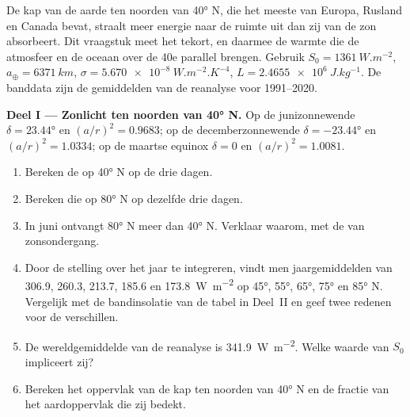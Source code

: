 \begin{problem}
\label{pb:b1:radiation-heat-transport:1}
De kap van de aarde ten noorden van \ang{40} N, die het meeste van Europa, Rusland en Canada bevat, straalt meer energie naar de ruimte uit dan zij van de zon absorbeert. Dit vraagstuk meet het tekort, en daarmee de warmte die de atmosfeer en de oceaan over de 40e parallel brengen. Gebruik $S_0 = \qty{1361}{W.m^{-2}}$,
$a_\oplus = \qty{6371}{km}$, $\sigma = \qty{5.670e-8}{W.m^{-2}.K^{-4}}$, $L =
\qty{2.4655e6}{J.kg^{-1}}$. De banddata zijn de gemiddelden van de reanalyse voor 1991--2020.

\medskip
\noindent\textbf{Deel I --- Zonlicht ten noorden van \ang{40} N.} Op de junizonnewende
$\delta = \ang{23.44}$ en $(a/r)^2 = 0.9683$; op de decemberzonnewende $\delta =
\ang{-23.44}$ en $(a/r)^2 = 1.0334$; op de maartse equinox $\delta = 0$ en
$(a/r)^2 = 1.0081$.
\begin{enumerate}
  \item Bereken de  op \ang{40} N op de drie dagen.
  \item Bereken die op \ang{80} N op dezelfde drie dagen.
  \item In juni ontvangt \ang{80} N meer dan \ang{40} N. Verklaar waarom, met de  van zonsondergang.
  \item Door de stelling over het jaar te integreren, vindt men jaargemiddelden van \qty{306.9}{}, \qty{260.3}{}, \qty{213.7}{}, \qty{185.6}{} en
        \qty{173.8}{W.m^{-2}} op \ang{45}, \ang{55}, \ang{65}, \ang{75} en
        \ang{85} N. Vergelijk met de bandinsolatie van de tabel in Deel~II en geef twee redenen voor de verschillen.
  \item De wereldgemiddelde  van de reanalyse is \qty{341.9}{W.m^{-2}}. Welke waarde van $S_0$ impliceert zij?
  \item Bereken het oppervlak van de kap ten noorden van \ang{40} N en de fractie van het aardoppervlak die zij bedekt.
\end{enumerate}


\end{problem}
